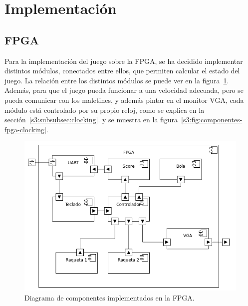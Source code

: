 \section{Implementación}
\label{s3:sec:Implementacion}


\subsection{FPGA}
\label{s3:subsec:fpga}
Para la implementación del juego sobre la FPGA, se ha decidido implementar
distintos módulos, conectados entre ellos, que permiten calcular el estado
del juego. La relación entre los distintos módulos se puede ver en la
figura~\ref{s3:fig:componentes-fpga-a}. Además, para que el juego pueda
funcionar a una velocidad adecuada, pero se pueda comunicar con los
maletines, y además pintar en el monitor VGA, cada módulo está controlado
por su propio reloj, como se explica en la sección~\ref{s3:subsubsec:clocking}.
y se muestra en la figura~\ref{s3:fig:componentes-fpga-clocking}. 


\begin{figure}[h]
  \centering
  \includegraphics[width=1.0\textwidth]{images/fpga_componentes_v2.png}
\caption{Diagrama de componentes implementados en la FPGA. }
\label{s3:fig:componentes-fpga-a}
\end{figure}

